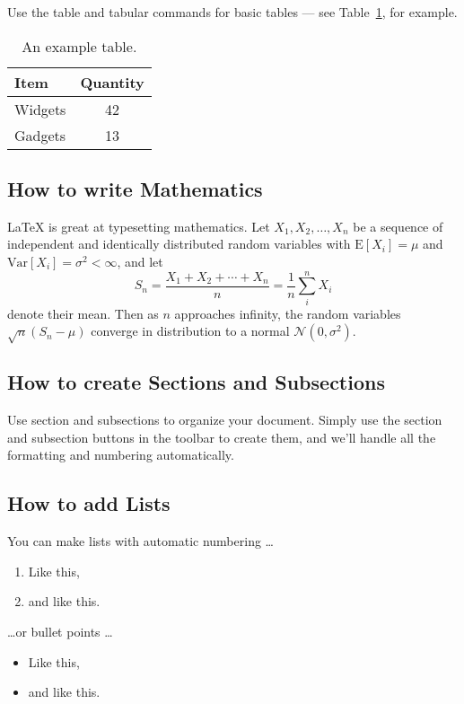\documentclass[a4paper,12pt]{article}
\begin{document}
Use the table and tabular commands for basic tables --- see Table~\ref{tab:widgets}, for example. 

\begin{table}
\centering
\begin{tabular}{|l|c|}
\hline
Item & Quantity \\\hline
Widgets & 42 \\
Gadgets & 13 \\
\hline
\end{tabular}
\caption{\label{tab:widgets}An example table.}
\end{table}

\subsection{How to write Mathematics}

\LaTeX{} is great at typesetting mathematics. Let $X_1, X_2, \ldots, X_n$ be a sequence of independent and identically distributed random variables with $\text{E}[X_i] = \mu$ and $\text{Var}[X_i] = \sigma^2 < \infty$, and let
\[S_n = \frac{X_1 + X_2 + \cdots + X_n}{n}
      = \frac{1}{n}\sum_{i}^{n} X_i\]
denote their mean. Then as $n$ approaches infinity, the random variables $\sqrt{n}(S_n - \mu)$ converge in distribution to a normal $\mathcal{N}(0, \sigma^2)$.


\subsection{How to create Sections and Subsections}

Use section and subsections to organize your document. Simply use the section and subsection buttons in the toolbar to create them, and we'll handle all the formatting and numbering automatically.

\subsection{How to add Lists}

You can make lists with automatic numbering \dots

\begin{enumerate}
\item Like this,
\item and like this.
\end{enumerate}
\dots or bullet points \dots
\begin{itemize}
\item Like this,
\item and like this.
\end{itemize}
\end{document}
